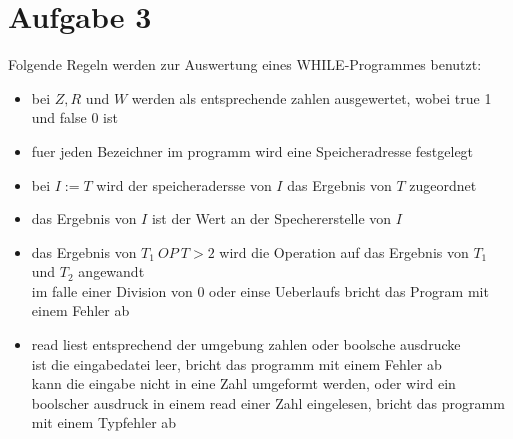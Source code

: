 \section*{Aufgabe 3}
Folgende Regeln werden zur Auswertung eines WHILE-Programmes benutzt:
\begin{itemize}
\item bei $Z, R$ und $W$ werden als entsprechende zahlen ausgewertet, wobei true 1 und false 0 ist
\item fuer jeden Bezeichner im programm wird eine Speicheradresse festgelegt
\item bei $I:=T$ wird der speicheradersse von $I$ das Ergebnis von $T$ zugeordnet
\item das Ergebnis von $I$ ist der Wert an der Spechererstelle von $I$
\item das Ergebnis von $T_1\>OP\>T>2$ wird die Operation auf das Ergebnis von $T_1$ und $T_2$ angewandt
    \\ im falle einer Division von 0 oder einse Ueberlaufs bricht das Program mit einem Fehler ab
\item read liest entsprechend der umgebung zahlen oder boolsche ausdrucke
    \\ ist die eingabedatei leer, bricht das programm mit einem Fehler ab
    \\ kann die eingabe nicht in eine Zahl umgeformt werden, oder wird ein boolscher ausdruck in einem read einer Zahl eingelesen,
        bricht das programm mit einem Typfehler ab
\end{itemize}


